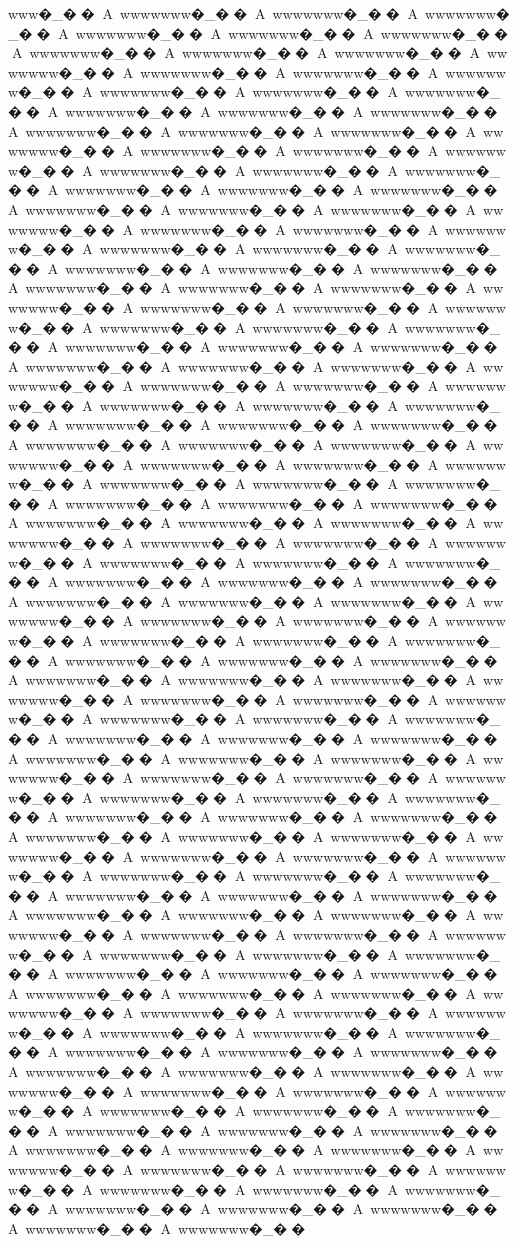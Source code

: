 {{{{{{{{{{{{{{{{{{{{{{{{{{{{{{{{{{{{{{{{{{{{{{{{{{{{{{{{{{{{{{{{{{{{{{{{{{{{{{{{www�_��A~wwwwwww�_��A~wwwwwww�_��A~wwwwwww�_��A~wwwwwww�_��A~wwwwwww�_��A~wwwwwww�_��A~wwwwwww�_��A~wwwwwww�_��A~wwwwwww�_��A~wwwwwww�_��A~wwwwwww�_��A~wwwwwww�_��A~wwwwwww�_��A~wwwwwww�_��A~wwwwwww�_��A~wwwwwww�_��A~wwwwwww�_��A~wwwwwww�_��A~wwwwwww�_��A~wwwwwww�_��A~wwwwwww�_��A~wwwwwww�_��A~wwwwwww�_��A~wwwwwww�_��A~wwwwwww�_��A~wwwwwww�_��A~wwwwwww�_��A~wwwwwww�_��A~wwwwwww�_��A~wwwwwww�_��A~wwwwwww�_��A~wwwwwww�_��A~wwwwwww�_��A~wwwwwww�_��A~wwwwwww�_��A~wwwwwww�_��A~wwwwwww�_��A~wwwwwww�_��A~wwwwwww�_��A~wwwwwww�_��A~wwwwwww�_��A~wwwwwww�_��A~wwwwwww�_��A~wwwwwww�_��A~wwwwwww�_��A~wwwwwww�_��A~wwwwwww�_��A~wwwwwww�_��A~wwwwwww�_��A~wwwwwww�_��A~wwwwwww�_��A~wwwwwww�_��A~wwwwwww�_��A~wwwwwww�_��A~wwwwwww�_��A~wwwwwww�_��A~wwwwwww�_��A~wwwwwww�_��A~wwwwwww�_��A~wwwwwww�_��A~wwwwwww�_��A~wwwwwww�_��A~wwwwwww�_��A~wwwwwww�_��A~wwwwwww�_��A~wwwwwww�_��A~wwwwwww�_��A~wwwwwww�_��A~wwwwwww�_��A~wwwwwww�_��A~wwwwwww�_��A~wwwwwww�_��A~wwwwwww�_��A~wwwwwww�_��A~wwwwwww�_��A~wwwwwww�_��A~wwwwwww�_��A~wwwwwww�_��A~wwwwwww�_��A~wwwwwww�_��A~wwwwwww�_��A~wwwwwww�_��A~wwwwwww�_��A~wwwwwww�_��A~wwwwwww�_��A~wwwwwww�_��A~wwwwwww�_��A~wwwwwww�_��A~wwwwwww�_��A~wwwwwww�_��A~wwwwwww�_��A~wwwwwww�_��A~wwwwwww�_��A~wwwwwww�_��A~wwwwwww�_��A~wwwwwww�_��A~wwwwwww�_��A~wwwwwww�_��A~wwwwwww�_��A~wwwwwww�_��A~wwwwwww�_��A~wwwwwww�_��A~wwwwwww�_��A~wwwwwww�_��A~wwwwwww�_��A~wwwwwww�_��A~wwwwwww�_��A~wwwwwww�_��A~wwwwwww�_��A~wwwwwww�_��A~wwwwwww�_��A~wwwwwww�_��A~wwwwwww�_��A~wwwwwww�_��A~wwwwwww�_��A~wwwwwww�_��A~wwwwwww�_��A~wwwwwww�_��A~wwwwwww�_��A~wwwwwww�_��A~wwwwwww�_��A~wwwwwww�_��A~wwwwwww�_��A~wwwwwww�_��A~wwwwwww�_��A~wwwwwww�_��A~wwwwwww�_��A~wwwwwww�_��A~wwwwwww�_��A~wwwwwww�_��A~wwwwwww�_��A~wwwwwww�_��A~wwwwwww�_��A~wwwwwww�_��A~wwwwwww�_��A~wwwwwww�_��A~wwwwwww�_��A~wwwwwww�_��A~wwwwwww�_��A~wwwwwww�_��A~wwwwwww�_��A~wwwwwww�_��A~wwwwwww�_��A~wwwwwww�_��A~wwwwwww�_��A~wwwwwww�_��A~wwwwwww�_��A~wwwwwww�_��A~wwwwwww�_��A~wwwwwww�_��A~wwwwwww�_��A~wwwwwww�_��A~wwwwwww�_��A~wwwwwww�_��A~wwwwwww�_��A~wwwwwww�_��A~wwwwwww�_��A~wwwwwww�_��A~wwwwwww�_��A~wwwwwww�_��A~wwwwwww�_��A~wwwwwww�_��A~wwwwwww�_��A~wwwwwww�_��A~wwwwwww�_��A~wwwwwww�_��A~wwwwwww�_��A~wwwwwww�_��A~wwwwwww�_��A~wwwwwww�_��A~wwwwwww�_��A~wwwwwww�_��A~wwwwwww�_��A~wwwwwww�_��A~wwwwwww�_��A~wwwwwww�_��A~wwwwwww�_��A~wwwwwww�_��A~wwwwwww�_��A~wwwwwww�_��A~wwwwwww�_��A~wwwwwww�_��A~wwwwwww�_��A~wwwwwww�_��A~wwwwwww�_��A~wwwwwww�_��A~wwwwwww�_��A~wwwwwww�_��A~wwwwwww�_��A~wwwwwww�_��A~wwwwwww�_��A~wwwwwww�_��A~wwwwwww�_��A~wwwwwww�_��A~wwwwwww�_��A~wwwwwww�_��A~wwwwwww�_��A~wwwwwww�_��A~wwwwwww�_��A~wwwwwww�_��A~wwwwwww�_��A~wwwwwww�_��A~wwwwwww�_��}}}}}}}}}}}}}}}}}}}}}}}}}}}}}}}}}}}}}}}}}}}}}}}}}}}}}}}}}}}}}}}}}}}}}}}}}}}}}}}}
